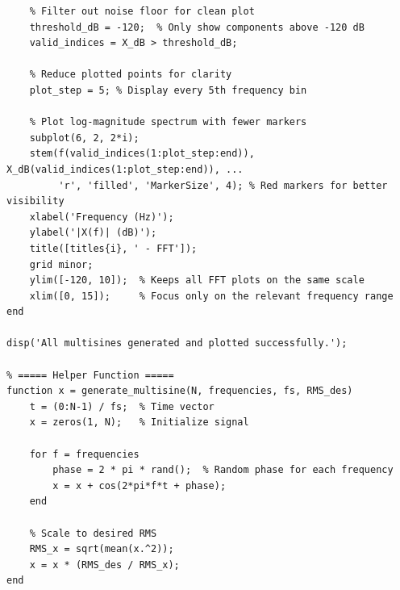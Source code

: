 \documentclass[a4paper,12pt]{article}
\begin{document}
\begin{lstlisting}
    % Filter out noise floor for clean plot
    threshold_dB = -120;  % Only show components above -120 dB
    valid_indices = X_dB > threshold_dB;

    % Reduce plotted points for clarity
    plot_step = 5; % Display every 5th frequency bin

    % Plot log-magnitude spectrum with fewer markers
    subplot(6, 2, 2*i);
    stem(f(valid_indices(1:plot_step:end)), X_dB(valid_indices(1:plot_step:end)), ...
         'r', 'filled', 'MarkerSize', 4); % Red markers for better visibility
    xlabel('Frequency (Hz)');
    ylabel('|X(f)| (dB)');
    title([titles{i}, ' - FFT']);
    grid minor;
    ylim([-120, 10]);  % Keeps all FFT plots on the same scale
    xlim([0, 15]);     % Focus only on the relevant frequency range
end

disp('All multisines generated and plotted successfully.');

% ===== Helper Function =====
function x = generate_multisine(N, frequencies, fs, RMS_des)
    t = (0:N-1) / fs;  % Time vector
    x = zeros(1, N);   % Initialize signal

    for f = frequencies
        phase = 2 * pi * rand();  % Random phase for each frequency
        x = x + cos(2*pi*f*t + phase);
    end

    % Scale to desired RMS
    RMS_x = sqrt(mean(x.^2));
    x = x * (RMS_des / RMS_x);
end

\end{lstlisting}
\end{document}
